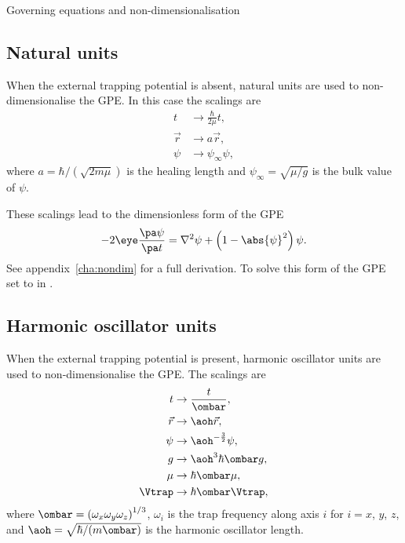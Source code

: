 \begin{chapter}{\label{cha:equations}Governing equations and
  non-dimensionalisation}
  \subsection{Natural units}
  When the external trapping potential is absent, natural units are used to
  non-dimensionalise the GPE.  In this case the scalings are
  \begin{equation*}
    \begin{aligned}
      t       &\to \frac{\hbar}{2\mu}t, \\
      \vec{r} &\to a\vec{r}, \\
      \psi    &\to \psi_{\infty} \psi,
    \end{aligned}
  \end{equation*}
  where $a = \hbar/(\sqrt{2m\mu})$ is the healing length and $\psi_{\infty} =
  \sqrt{\mu/g}$ is the bulk value of $\psi$.

  These scalings lead to the dimensionless form of the GPE
  \begin{equation*}
    -2\eye\frac{\pa \psi}{\pa t} = \nabla^{2}\psi + \left(1 -
    \abs{\psi}^{2}\right)\psi.
  \end{equation*}
  See appendix~\ref{cha:nondim} for a full derivation.  To solve this form of
  the GPE set  to  in .

  \subsection{Harmonic oscillator units}
  When the external trapping potential is present, harmonic oscillator units
  are used to non-dimensionalise the GPE.  The scalings are
  \begin{equation*}
    \begin{aligned}
      t       &\to \frac{t}{\ombar}, \\
      \vec{r} &\to \aoh\vec{r}, \\
      \psi    &\to \aoh^{-\frac{3}{2}} \psi, \\
      g       &\to \aoh^{3}\hbar\ombar g, \\
      \mu     &\to \hbar\ombar\mu, \\
      \Vtrap  &\to \hbar\ombar\Vtrap,
    \end{aligned}
  \end{equation*}
  where $\ombar = \left( \omega_{x}\omega_{y}\omega_{z}
  \right)^{1/3}$, $\omega_{i}$ is the trap frequency along axis $i$ for $i =
  x$, $y$, $z$, and $\aoh = \sqrt{\hbar/(m\ombar)}$ is the
  harmonic oscillator length.


\end{chapter}
